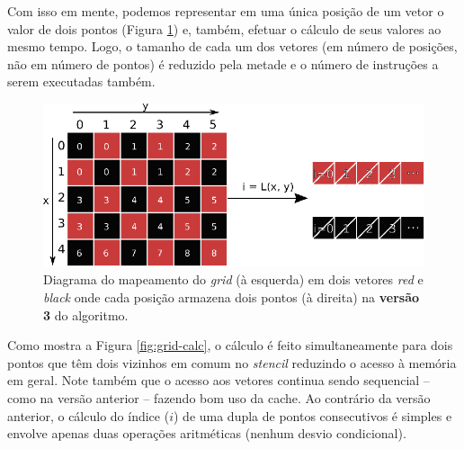 Com isso em mente, podemos representar em uma única posição de um vetor o valor de dois pontos (Figura \ref{fig:grid-v3}) e, também, efetuar o cálculo de seus valores ao mesmo tempo. Logo, o tamanho de cada um dos vetores (em número de posições, não em número de pontos) é reduzido pela metade e o número de instruções a serem executadas também.

\begin{figure}[h]
    \centering
    \includegraphics[width=.8\textwidth]{figures/grid-v3}

    \caption{Diagrama do mapeamento do \textit{grid} (à esquerda) em dois vetores \textit{red} e \textit{black} onde cada posição armazena dois pontos (à direita) na \textbf{versão 3} do algoritmo.}
    \label{fig:grid-v3}
\end{figure}

Como mostra a Figura \ref{fig:grid-calc}, o cálculo é feito simultaneamente para dois pontos que têm dois vizinhos em comum no \textit{stencil} reduzindo o acesso à memória em geral. Note também que o acesso aos vetores continua sendo sequencial -- como na versão anterior -- fazendo bom uso da cache. Ao contrário da versão anterior, o cálculo do índice ($i$) de uma dupla de pontos consecutivos é simples e envolve apenas duas operações aritméticas (nenhum desvio condicional).

